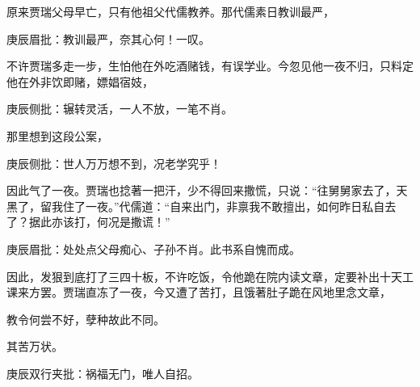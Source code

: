 \begin{parag}


    原来贾瑞父母早亡，只有他祖父代儒教养。那代儒素日教训最严，\begin{note}庚辰眉批：教训最严，奈其心何！一叹。\end{note}不许贾瑞多走一步，生怕他在外吃酒赌钱，有误学业。今忽见他一夜不归，只料定他在外非饮即赌，嫖娼宿妓，\begin{note}庚辰侧批：辗转灵活，一人不放，一笔不肖。\end{note}那里想到这段公案，\begin{note}庚辰侧批：世人万万想不到，况老学究乎！\end{note}因此气了一夜。贾瑞也捻著一把汗，少不得回来撒慌，只说：“往舅舅家去了，天黑了，留我住了一夜。”代儒道：“自来出门，非禀我不敢擅出，如何昨日私自去了？据此亦该打，何况是撒谎！”\begin{note}庚辰眉批：处处点父母痴心、子孙不肖。此书系自愧而成。\end{note}因此，发狠到底打了三四十板，不许吃饭，令他跪在院内读文章，定要补出十天工课来方罢。贾瑞直冻了一夜，今又遭了苦打，且饿著肚子跪在风地里念文章，\begin{note}教令何尝不好，孽种故此不同。\end{note}其苦万状。\begin{note}庚辰双行夹批：祸福无门，唯人自招。\end{note}
\end{parag}


